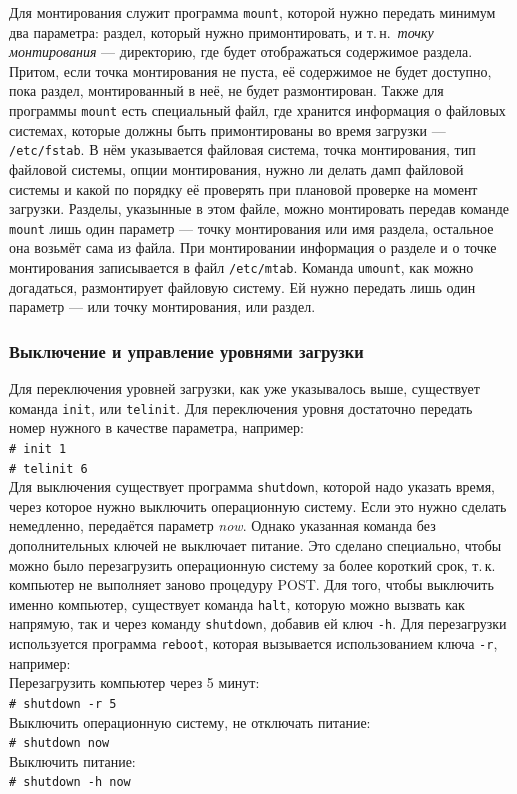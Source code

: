 Для монтирования служит программа \texttt{mount}, которой нужно передать минимум два параметра: раздел, который нужно примонтировать, и т.\,н.~\emph{точку монтирования} --- директорию, где будет отображаться содержимое раздела. Притом, если точка монтирования не пуста, её содержимое не будет доступно, пока раздел, монтированный в неё, не будет размонтирован.
Также для программы \texttt{mount} есть специальный файл, где хранится информация о файловых системах, которые должны быть примонтированы во время загрузки --- \texttt{/etc/fstab}\label{fstab}. В нём указывается файловая система, точка монтирования, тип файловой системы, опции монтирования, нужно ли делать дамп файловой системы и какой по порядку её проверять при плановой проверке на момент загрузки.
Разделы, указынные в этом файле, можно монтировать передав команде \texttt{mount} лишь один параметр --- точку монтирования или имя раздела, остальное она возьмёт сама из файла.
При монтировании информация о разделе и о точке монтирования записывается в файл \texttt{/etc/mtab}.
Команда \texttt{umount}, как можно догадаться, размонтирует файловую систему. Ей нужно передать лишь один параметр --- или точку монтирования, или раздел.

\subsubsection{Выключение и управление уровнями загрузки}\label{base:os:structure:sysutils:shutdown}
Для переключения уровней загрузки, как уже указывалось выше, существует команда \texttt{init}, или \texttt{telinit}. Для переключения уровня достаточно передать номер нужного в качестве параметра, например:\\
\texttt{\# init 1}\\
\texttt{\# telinit 6}\\
Для выключения существует программа \texttt{shutdown}, которой надо указать время, через которое нужно выключить операционную систему. Если это нужно сделать немедленно, передаётся параметр \emph{now}. Однако указанная команда без дополнительных ключей не выключает питание. Это сделано специально, чтобы можно было перезагрузить операционную систему за более короткий срок, т.\,к. компьютер не выполняет заново процедуру POST.
Для того, чтобы выключить именно компьютер, существует команда \texttt{halt}, которую можно вызвать как напрямую, так и через команду \texttt{shutdown}, добавив ей ключ \texttt{-h}. Для перезагрузки используется программа \texttt{reboot}, которая вызывается использованием ключа \texttt{-r}, например:\\
Перезагрузить компьютер через 5 минут:\\
\texttt{\# shutdown -r 5}\\
Выключить операционную систему, не отключать питание:\\
\texttt{\# shutdown now}\\
Выключить питание:\\
\texttt{\# shutdown -h now}
 
